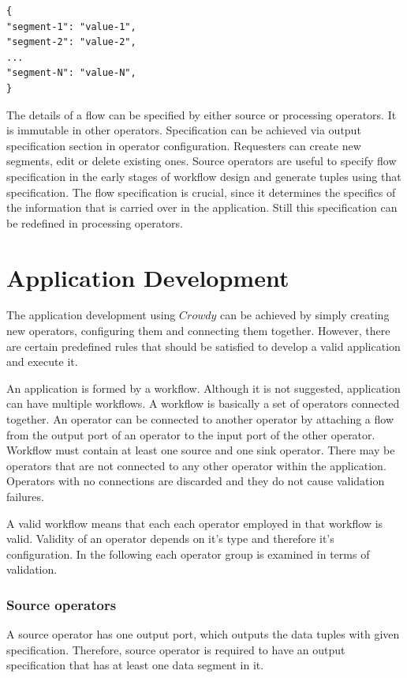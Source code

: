 \begin{lstlisting}
{
"segment-1": "value-1",
"segment-2": "value-2",
...
"segment-N": "value-N",
}
\end{lstlisting}

The details of a flow can be specified by either source or processing operators. It is 
immutable in other operators. Specification can be achieved via output specification section 
in operator configuration. Requesters can create new segments, edit or delete existing ones. 
Source operators are useful to specify flow specification in the early stages of workflow 
design and generate tuples using that specification. The flow specification is crucial, since 
it determines the specifics of the information that is carried over in the application. Still this 
specification can be redefined in processing operators.

\section{Application Development}
\label{sec:flow comp}
The application development using $Crowdy$ can be achieved by simply creating new 
operators, configuring them and connecting them together. However, there are certain 
predefined rules that should be satisfied to develop a valid application and execute it.

An application is formed by a workflow. Although it is not suggested, application can have 
multiple workflows. A workflow is basically a set of operators connected together. An operator 
can be connected to another operator by attaching a flow from the output port of an operator 
to the input port of the other operator. Workflow must contain at least one source and one 
sink operator. There may be operators that are not connected to any 
other operator within the application. Operators with no connections are discarded and 
they do not cause validation failures.


A valid workflow means that each each operator employed in that workflow is valid. Validity of 
an operator depends on it's type and therefore it's configuration. In the following each operator 
group is examined in terms of validation.

\subsubsection{Source operators}
A source operator has one output port, which outputs the data tuples with given specification. 
Therefore, source operator is required to have an output specification that has at least one data 
segment in it.

